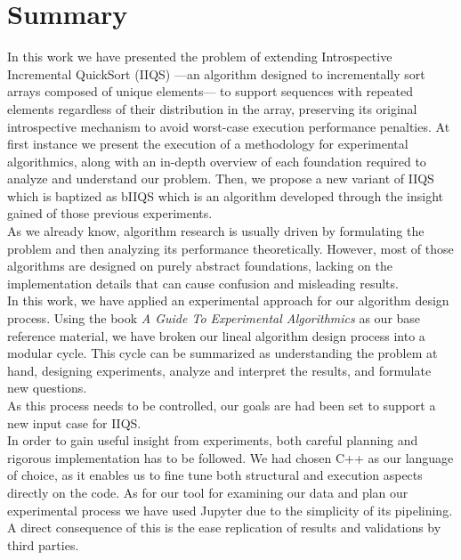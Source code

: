 \chapter{Summary}
\label{CHAPTER:SUMMARY}

In this work we have presented the problem of extending Introspective Incremental QuickSort (IIQS) ---an algorithm designed to incrementally sort arrays composed of unique elements--- to support sequences with repeated elements regardless of their distribution in the array, preserving its original introspective mechanism to avoid worst-case execution performance penalties. At first instance we present the execution of  a methodology for experimental algorithmics, along with an in-depth overview of each foundation required to analyze and understand our problem. Then, we propose a new variant of IIQS which is baptized as bIIQS which is an algorithm developed through the insight gained of those previous experiments.\\

As we already know, algorithm research is usually driven by formulating the problem and then analyzing its performance theoretically. However, most of those algorithms are designed on purely abstract foundations, lacking on the implementation details that can cause confusion and misleading results.\\

In this work, we have applied an experimental approach for our algorithm design process. Using the book \emph{A Guide To Experimental Algorithmics}\cite{10.5555/2159557} as our base reference material, we have broken our lineal algorithm design process into a modular cycle. This cycle can be summarized as understanding the problem at hand, designing experiments, analyze and interpret the results, and formulate new questions.\\

As this process needs to be controlled, our goals are had been set to support a new input case for IIQS.\\

In order to gain useful insight from experiments, both careful planning and rigorous implementation has to be followed. We had chosen C++ as our language of choice, as it enables us to fine tune both structural and execution aspects directly on the code. As for our tool for examining our data and plan our experimental process we have used Jupyter due to the simplicity of its pipelining. A direct consequence of this is the ease replication of results and validations by third parties.\\

